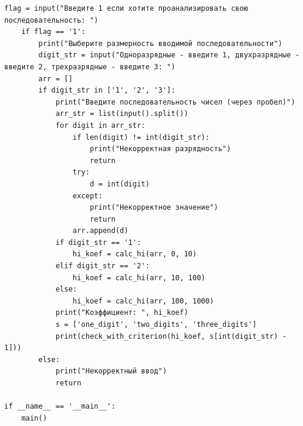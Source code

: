\documentclass[14pt, a4paper]{extarticle}
\begin{document}
\begin{lstlisting}[label=lst:list1]
    flag = input("Введите 1 если хотите проанализировать свою последовательность: ")
    if flag == '1':
        print("Выберите размерность вводимой последовательности")
        digit_str = input("Одноразрядные - введите 1, двухразрядные - введите 2, трехразрядные - введите 3: ")
        arr = []
        if digit_str in ['1', '2', '3']:
            print("Введите последовательность чисел (через пробел)")
            arr_str = list(input().split())
            for digit in arr_str:
                if len(digit) != int(digit_str):
                    print("Некорректная разрядность")
                    return
                try:
                    d = int(digit)
                except:
                    print("Некорректное значение")
                    return
                arr.append(d)
            if digit_str == '1':
                hi_koef = calc_hi(arr, 0, 10)
            elif digit_str == '2':
                hi_koef = calc_hi(arr, 10, 100)
            else:
                hi_koef = calc_hi(arr, 100, 1000)
            print("Коэффициент: ", hi_koef)
            s = ['one_digit', 'two_digits', 'three_digits']
            print(check_with_criterion(hi_koef, s[int(digit_str) - 1]))
        else:
            print("Некорректный ввод")
            return

if __name__ == '__main__':
    main()

\end{lstlisting}
\end{document}
